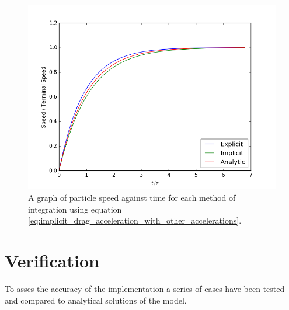 \documentclass[10pt,a4paper,titlepage]{report}
\begin{document}
\begin{figure}[!htb]
\centering
\includegraphics[scale=0.75]{figures/TerminalVelocityImplicitExplicit.png}
\caption{A graph of particle speed against time for each method of integration using equation \ref{eq:implicit_drag_acceleration_with_other_accelerations}.}
\label{fig:fig:terminal_velocity_implicit_explicit}
\end{figure}
\section{Verification}
To asses the accuracy of the implementation a series of cases have been tested and compared to analytical solutions of the model.
\end{document}
